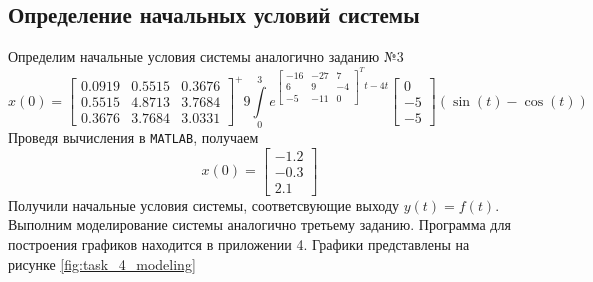 \documentclass[a4paper, 12pt]{article}
\begin{document}
    \subsection{Определение начальных условий системы}
    Определим начальные условия системы аналогично заданию №3
    $$
    x(0)=\begin{bmatrix}
        0.0919    &0.5515    &0.3676\\
        0.5515    &4.8713    &3.7684\\
        0.3676    &3.7684    &3.0331
    \end{bmatrix}^+9\int\limits_{0}^{3}e^{\begin{bmatrix}
        -16 &-27 &7\\
        6 &9 &-4\\
        -5 &-11 &0
    \end{bmatrix}^Tt-4t}\begin{bmatrix}
        0\\
        -5\\
        -5
    \end{bmatrix}\left(\sin{(t)}-\cos{(t)}\right)
    $$
    Проведя вычисления в \texttt{MATLAB}, получаем
    $$
    x(0)=\begin{bmatrix}
    -1.2\\
   -0.3\\
    2.1
    \end{bmatrix}
    $$
    Получили начальные условия системы, соответсвующие выходу $y(t)=f(t)$.
    Выполним моделирование системы аналогично третьему заданию. 
    Программа для построения графиков находится в приложении 4.
    Графики представлены на рисунке \ref{fig:task_4_modeling}
\end{document}
